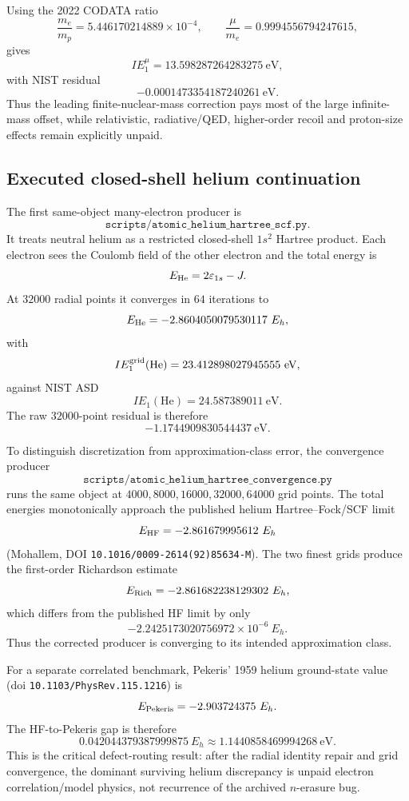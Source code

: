 Using the 2022 CODATA ratio
\[
  \frac{m_e}{m_p}=5.446170214889\times10^{-4},
\qquad
  \frac{\mu}{m_e}=0.9994556794247615,
\]
gives
\[
  IE_1^{\mu}=13.598287264283275\ \mathrm{eV},
\]
with NIST residual
\[
  -0.0001473354187240261\ \mathrm{eV}.
\]
Thus the leading finite-nuclear-mass correction pays most of the large
infinite-mass offset, while relativistic, radiative/QED, higher-order recoil and
proton-size effects remain explicitly unpaid.

\subsection{Executed closed-shell helium continuation}

The first same-object many-electron producer is
\[
\texttt{scripts/atomic\_helium\_hartree\_scf.py}.
\]
It treats neutral helium as a restricted closed-shell $1s^2$ Hartree product.
Each electron sees the Coulomb field of the other electron and the total energy
is
\[
  E_{\rm He}=2\varepsilon_{1s}-J.
\]
At $32000$ radial points it converges in $64$ iterations to
\[
  E_{\rm He}=-2.8604050079530117\ E_h,
\]
with
\[
  IE_1^{\rm grid}(\mathrm{He})=23.412898027945555\ \mathrm{eV},
\]
against NIST ASD
\[
  IE_1(\mathrm{He})=24.587389011\ \mathrm{eV}.
\]
The raw $32000$-point residual is therefore
\[
  -1.1744909830544437\ \mathrm{eV}.
\]

To distinguish discretization from approximation-class error, the convergence
producer
\[
\texttt{scripts/atomic\_helium\_hartree\_convergence.py}
\]
runs the same object at $4000,8000,16000,32000,64000$ grid points. The total
energies monotonically approach the published helium Hartree--Fock/SCF limit
\[
  E_{\rm HF}=-2.861679995612\ E_h
\]
(Mohallem, DOI \texttt{10.1016/0009-2614(92)85634-M}). The two finest grids
produce the first-order Richardson estimate
\[
  E_{\rm Rich}=-2.861682238129302\ E_h,
\]
which differs from the published HF limit by only
\[
  -2.2425173020756972\times10^{-6}\ E_h.
\]
Thus the corrected producer is converging to its intended approximation class.

For a separate correlated benchmark, Pekeris' 1959 helium ground-state value
(doi \texttt{10.1103/PhysRev.115.1216}) is
\[
  E_{\rm Pekeris}=-2.903724375\ E_h.
\]
The HF-to-Pekeris gap is therefore
\[
  0.042044379387999875\ E_h
  \approx 1.1440858469994268\ \mathrm{eV}.
\]
This is the critical defect-routing result: after the radial identity repair and
grid convergence, the dominant surviving helium discrepancy is unpaid
electron correlation/model physics, not recurrence of the archived $n$-erasure
bug.

